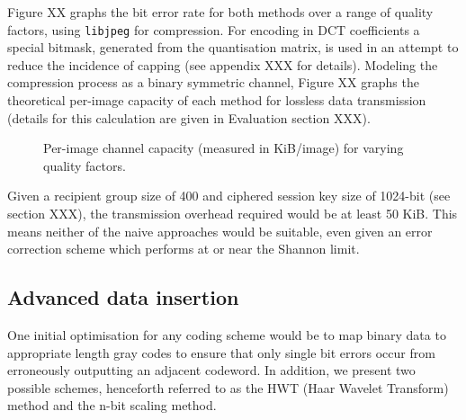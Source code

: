 Figure XX graphs the bit error rate for both methods over a range of quality factors, using {\tt libjpeg} for compression. For encoding in DCT coefficients a special bitmask, generated from the quantisation matrix, is used in an attempt to reduce the incidence of capping (see appendix XXX for details). Modeling the compression process as a binary symmetric channel, Figure XX graphs the theoretical per-image capacity of each method for lossless data transmission (details for this calculation are given in Evaluation section XXX).


\begin{figure}[tbph]
  \begin{center}
    \caption{Per-image channel capacity (measured in KiB/image) for varying quality factors.}
    \label{graph:capacity0}
  \end{center}
\end{figure}

Given a recipient group size of 400 and ciphered session key size of 1024-bit (see section XXX), the transmission overhead required would be at least 50 KiB. This means neither of the naive approaches would be suitable, even given an error correction scheme which performs at or near the Shannon limit. 


\subsection{Advanced data insertion}

One initial optimisation for any coding scheme would be to map binary data to appropriate length gray codes to ensure that only single bit errors occur from erroneously outputting an adjacent codeword. In addition, we present two possible schemes, henceforth referred to as the HWT (Haar Wavelet Transform) method and the n-bit scaling method.

